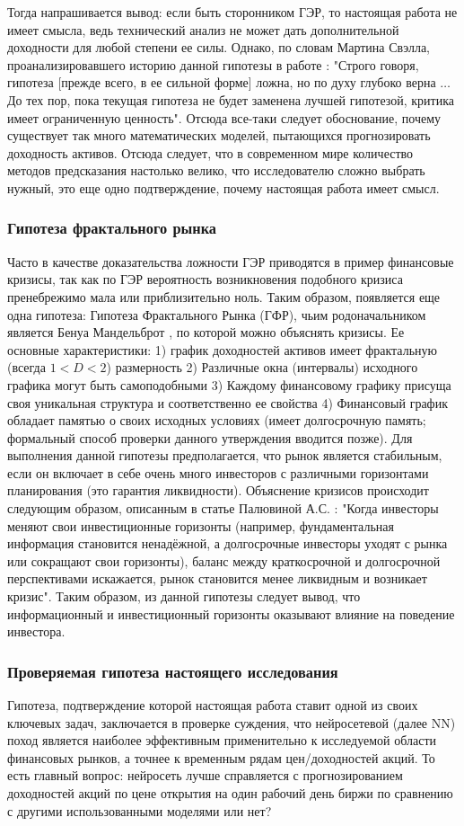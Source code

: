 			Тогда напрашивается вывод: если быть сторонником ГЭР, то настоящая работа не имеет смысла, ведь технический анализ не может дать дополнительной доходности для любой степени ее силы. Однако, по словам Мартина Свэлла, проанализировавшего историю данной гипотезы в работе \cite{matrin_swell}: "Строго говоря, гипотеза [прежде всего, в ее сильной форме] ложна, но по духу глубоко верна $\ldots$ До тех пор, пока текущая гипотеза не будет заменена лучшей гипотезой, критика имеет ограниченную ценность". Отсюда все-таки следует обоснование, почему существует так много математических моделей, пытающихся прогнозировать доходность активов. Отсюда следует, что в современном мире количество методов предсказания настолько велико, что исследователю сложно выбрать нужный, это еще одно подтверждение, почему настоящая работа имеет смысл.
		\subsubsection{Гипотеза фрактального рынка}
			Часто в качестве доказательства ложности ГЭР приводятся в пример финансовые кризисы, так как по ГЭР вероятность возникновения подобного кризиса пренебрежимо мала или приблизительно ноль. Таким образом, появляется еще одна гипотеза: Гипотеза Фрактального Рынка (ГФР), чьим родоначальником является Бенуа Мандельброт \cite{benoit_mandelbrot}, по которой можно объяснять кризисы. Ее основные характеристики: 1) график доходностей активов имеет фрактальную (всегда $1 < D <2$) размерность 2) Различные окна (интервалы) исходного графика могут быть самоподобными 3) Каждому финансовому графику присуща своя уникальная структура и соответственно ее свойства 4) Финансовый график обладает памятью о своих исходных условиях (имеет долгосрочную память; формальный способ проверки данного утверждения вводится позже). Для выполнения данной гипотезы предполагается, что рынок является стабильным, если он включает в себе очень много инвесторов с различными горизонтами планирования (это гарантия ликвидности). Объяснение кризисов происходит следующим образом, описанным в статье Палювиной А.С. \cite{fractal_market}: "Когда инвесторы меняют свои инвестиционные горизонты (например, фундаментальная информация становится ненадёжной, а	долгосрочные инвесторы уходят с рынка или сокращают свои горизонты),	баланс между краткосрочной и долгосрочной перспективами искажается,	рынок становится менее ликвидным и возникает кризис". Таким образом, из данной гипотезы следует вывод, что информационный и инвестиционный горизонты оказывают влияние на поведение инвестора.
		\subsubsection[Проверяемая гипотеза]{Проверяемая гипотеза настоящего исследования}
			Гипотеза, подтверждение которой настоящая работа ставит одной из своих ключевых задач, заключается в проверке суждения, что нейросетевой (далее NN) поход является наиболее эффективным применительно к исследуемой области финансовых рынков, а точнее к временным рядам цен/доходностей акций. То есть главный вопрос: нейросеть лучше справляется с прогнозированием доходностей акций по цене открытия на один рабочий день биржи по сравнению с другими использованными моделями или нет?
